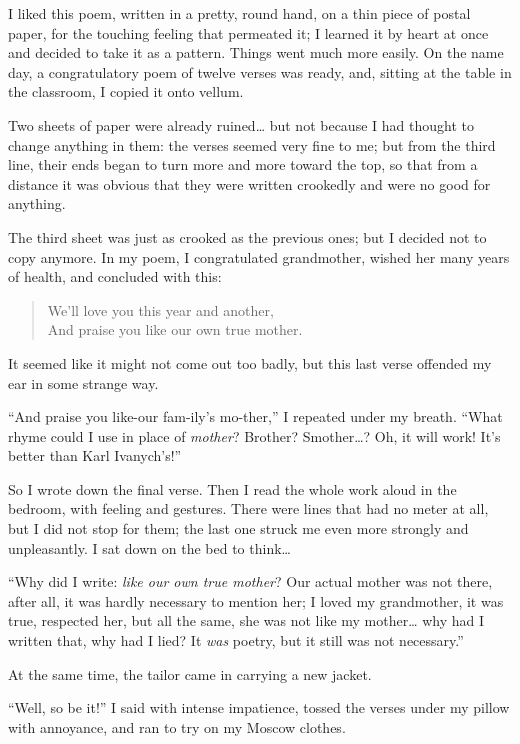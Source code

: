 I liked this poem, written in a pretty, round hand, on a thin piece of postal paper, for the touching feeling that permeated it; I learned it by heart at once and decided to take it as a pattern. Things went much more easily. On the name day, a congratulatory poem of twelve verses was ready, and, sitting at the table in the classroom, I copied it onto vellum.

Two sheets of paper were already ruined\ldots{} but not because I had thought to change anything in them: the verses seemed very fine to me; but from the third line, their ends began to turn more and more toward the top, so that from a distance it was obvious that they were written crookedly and were no good for anything.

The third sheet was just as crooked as the previous ones; but I decided not to copy anymore. In my poem, I congratulated grandmother, wished her many years of health, and concluded with this:

\begin{verse}
We'll love you this year and another,\\
And praise you like our own true mother.
\end{verse}

It seemed like it might not come out too badly, but this last verse offended my ear in some strange way.

``And praise you like-our fam-ily's mo-ther,'' I repeated under my breath. ``What rhyme could I use in place of \emph{mother}? Brother? Smother\ldots{}? Oh, it will work! It's better than Karl Ivanych's!'' %

So I wrote down the final verse. Then I read the whole work aloud in the bedroom, with feeling and gestures. There were lines that had no meter at all, but I did not stop for them; the last one struck me even more strongly and unpleasantly. I sat down on the bed to think\ldots{}

``Why did I write: \textit{like our own true mother}? Our actual mother was not there, after all, it was hardly necessary to mention her; I loved my grandmother, it was true, respected her, but all the same, she was not like my mother\ldots{} why had I written that, why had I lied? It \emph{was} poetry, but it still was not necessary.'' %

At the same time, the tailor came in carrying a new jacket.

``Well, so be it!'' I said with intense impatience, tossed the verses under my pillow with annoyance, and ran to try on my Moscow clothes. %

